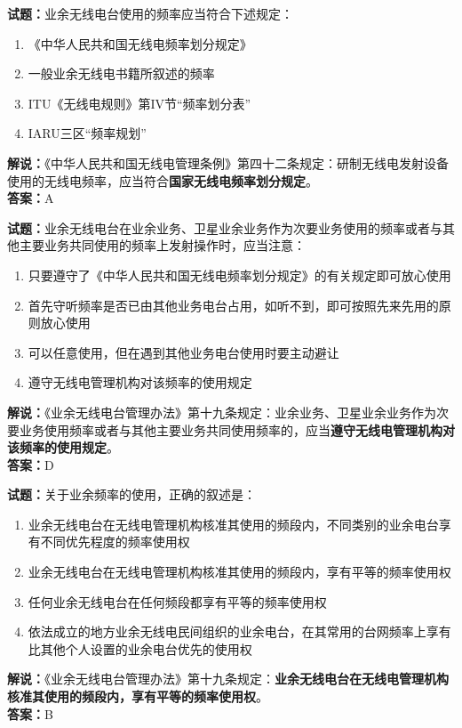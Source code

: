 \documentclass{ctexbook}
\begin{document}
\bigskip


\noindent\textbf{试题：}业余无线电台使用的频率应当符合下述规定：
\begin{enumerate}[leftmargin=3em]
	\item 《中华人民共和国无线电频率划分规定》
	\item 一般业余无线电书籍所叙述的频率
	\item ITU《无线电规则》第IV节“频率划分表”
	\item IARU三区“频率规划”
\end{enumerate}
\noindent\textbf{解说：}《中华人民共和国无线电管理条例》第四十二条规定：研制无线电发射设备使用的无线电频率，应当符合\textbf{国家无线电频率划分规定}。\\\noindent\textbf{答案：}A




\bigskip


\noindent\textbf{试题：}业余无线电台在业余业务、卫星业余业务作为次要业务使用的频率或者与其他主要业务共同使用的频率上发射操作时，应当注意：
\begin{enumerate}[leftmargin=3em]
	\item 只要遵守了《中华人民共和国无线电频率划分规定》的有关规定即可放心使用
	\item 首先守听频率是否已由其他业务电台占用，如听不到，即可按照先来先用的原则放心使用
	\item 可以任意使用，但在遇到其他业务电台使用时要主动避让
	\item 遵守无线电管理机构对该频率的使用规定
\end{enumerate}
\noindent\textbf{解说：}《业余无线电台管理办法》第十九条规定：业余业务、卫星业余业务作为次要业务使用频率或者与其他主要业务共同使用频率的，应当\textbf{遵守无线电管理机构对该频率的使用规定}。\\\noindent\textbf{答案：}D




\bigskip


\noindent\textbf{试题：}关于业余频率的使用，正确的叙述是：
\begin{enumerate}[leftmargin=3em]
	\item 业余无线电台在无线电管理机构核准其使用的频段内，不同类别的业余电台享有不同优先程度的频率使用权
	\item 业余无线电台在无线电管理机构核准其使用的频段内，享有平等的频率使用权
	\item 任何业余无线电台在任何频段都享有平等的频率使用权
	\item 依法成立的地方业余无线电民间组织的业余电台，在其常用的台网频率上享有比其他个人设置的业余电台优先的使用权
\end{enumerate}
\noindent\textbf{解说：}《业余无线电台管理办法》第十九条规定：\textbf{业余无线电台在无线电管理机构核准其使用的频段内，享有平等的频率使用权}。\\\noindent\textbf{答案：}B
\end{document}
